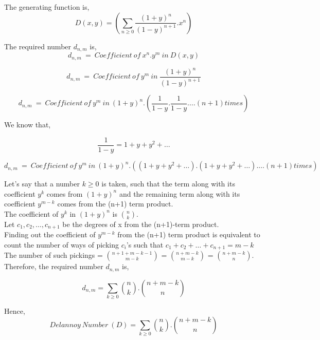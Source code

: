 The generating function is,
\begin{equation}
\boxed{D(x,y) = \left(\sum_{n \geq 0}{\frac{{(1+y)}^n}{{(1-y)}^{n+1}}}.x^n \right)}
\end{equation}

The required number $d_{n,m}$ is,\\

$$d_{n,m}~=~Coefficient~of~x^n.y^m~in~D(x,y)$$

$$d_{n,m}~=~Coefficient~of~y^m~in~{\frac{{(1+y)}^n}{{(1-y)}^{n+1}}}$$

$$d_{n,m}~=~Coefficient~of~y^m~in~ {(1+y)}^n.\left(\frac{1}{1-y}.\frac{1}{1-y}. \dots (n+1) times\right)$$

We know that,

$$\frac{1}{1-y} = 1+y+y^2+ \dots$$

$$d_{n,m}~=~Coefficient~of~y^m~in~{(1+y)}^n.\left((1+y+y^2+\dots).(1+y+y^2+\dots). \dots (n+1) times\right)$$

Let's say that a number $k \geq 0$ is taken, such that the term along with its coefficient $y^k$ comes from ${(1+y)^n}$ and the remaining term along with its coefficient $y^{m-k}$ comes from the (n+1) term product.\\

The coefficient of $y^k$ in ${(1+y)^n}$ is ${n \choose k}$.\\

Let $c_1,c_2,\dots,c_{n+1}$ be the degrees of x from the (n+1)-term product.\\

Finding out the coefficient of $y^{m-k}$ from the (n+1) term product is equivalent to count the number of ways of picking $c_i$'s such that $c_1+c_2+\dots+c_{n+1}=m-k$\\

The number of such pickings = ${{n+1+m-k-1} \choose {m-k}}$ = ${n+m-k} \choose {m-k}$ = ${n+m-k} \choose {n}$.\\

Therefore, the required number $d_{n,m}$ is,

$$d_{n,m} = \sum_{k \geq 0}{n \choose k}.{{n+m-k} \choose n}$$

Hence,
\begin{equation}
\boxed{Delannoy~Number~(D) = \sum_{k \geq 0}{n \choose k}.{{n+m-k} \choose n}}
\end{equation}























 

